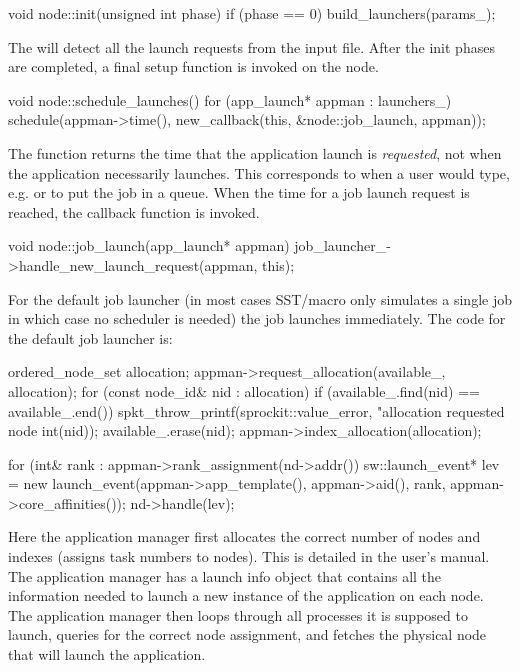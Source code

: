\begin{CppCode}
void node::init(unsigned int phase)
{
  if (phase == 0){
    build_launchers(params_);
  }
}
\end{CppCode}
The  will detect all the launch requests from the input file.  After the init phases are completed, a final setup function is invoked on the node.

\begin{CppCode}
void node::schedule_launches()
{
  for (app_launch* appman : launchers_){
    schedule(appman->time(), new_callback(this, &node::job_launch, appman));
  }
}
\end{CppCode}
The function  returns the time that the application launch is \emph{requested}, not when the application  necessarily launches.
This corresponds to when a user would type, e.g.  or  to put the job in a queue.
When the time for a job launch request is reached, the callback function is invoked.

\begin{CppCode}
void node::job_launch(app_launch* appman)
{
  job_launcher_->handle_new_launch_request(appman, this);
}
\end{CppCode}
For the default job launcher (in most cases SST/macro only simulates a single job in which case no scheduler is needed) the job launches immediately. 
The code for the default job launcher is:

\begin{CppCode}
ordered_node_set allocation;
appman->request_allocation(available_, allocation);
for (const node_id& nid : allocation){
  if (available_.find(nid) == available_.end()){
    spkt_throw_printf(sprockit::value_error,
                      "allocation requested node %
                      int(nid));
  }
  available_.erase(nid);
}
appman->index_allocation(allocation);

for (int& rank : appman->rank_assignment(nd->addr()){
  sw::launch_event* lev = new launch_event(appman->app_template(), appman->aid(),
                                             rank, appman->core_affinities());
  nd->handle(lev);
}
\end{CppCode}
Here the application manager first allocates the correct number of nodes and indexes (assigns task numbers to nodes).
This is detailed in the user's manual.
The application manager has a launch info object that contains all the information needed to launch a new instance of the application on each node.
The application manager then loops through all processes it is supposed to launch,
queries for the correct node assignment,
and fetches the physical node that will launch the application.

